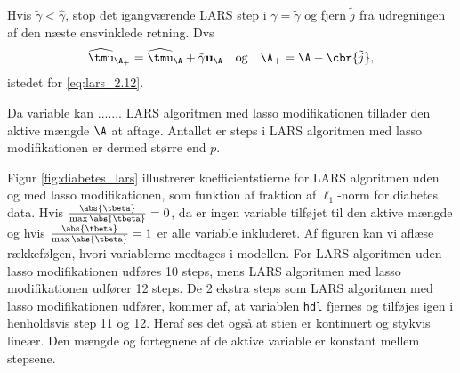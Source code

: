 %
Hvis \(\tilde{\gamma} < \widehat{\gamma}\), stop det igangværende LARS step i \(\gamma = \tilde{\gamma}\) og fjern \(\tilde{j}\) fra udregningen af den næste ensvinklede retning.
Dvs
\begin{align*}
\widehat{\tmu}_{\A_+} = \widehat{\tmu}_\A + \tilde{\gamma} \mathbf{u}_\A \quad \text{og} \quad \A_+ = \A - \cbr{\tilde{j}},
\end{align*}
istedet for \eqref{eq:lars_2.12}.

Da variable kan .......
LARS algoritmen med lasso modifikationen tillader den aktive mængde \(\A\) at aftage.
Antallet er steps i LARS algoritmen med lasso modifikationen er dermed større end \(p\).



\begin{eks}
Figur \ref{fig:diabetes_lars} illustrerer koefficientstierne for LARS algoritmen uden og med lasso modifikationen, som funktion af fraktion af \(\ell_1\)-norm for diabetes data.
Hvis \(\frac{\abs{\tbeta}}{\max \abs{\tbeta}} = 0\), da er ingen variable tilføjet til den aktive mængde og hvis \(\frac{\abs{\tbeta}}{\max \abs{\tbeta}} = 1\) er alle variable inkluderet.
Af figuren kan vi aflæse rækkefølgen, hvori variablerne medtages i modellen.
For LARS algoritmen uden lasso modifikationen udføres 10 steps, mens LARS algoritmen med lasso modifikationen udfører 12 steps.
De 2 ekstra steps som LARS algoritmen med lasso modifikationen udfører, kommer af, at variablen \texttt{hdl} fjernes og tilføjes igen i henholdsvis step 11 og 12.
Heraf ses det også at stien er kontinuert og stykvis lineær.
Den mængde og fortegnene af de aktive variable er konstant mellem stepsene.

\end{eks}

